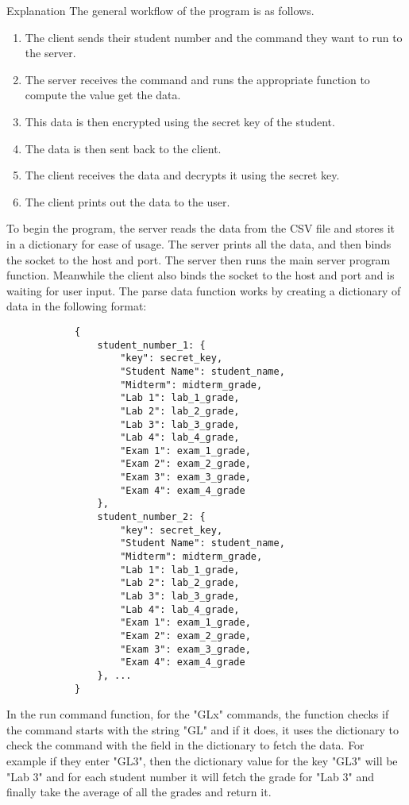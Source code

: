 \documentclass[titlepage]{article}
\begin{document}
    \begin{section}{Explanation}
        The general workflow of the program is as follows.
        \begin{enumerate}
            \item The client sends their student number and the command they want to run to the server.
            \item The server receives the command and runs the appropriate function to compute the value get the data.
            \item This data is then encrypted using the secret key of the student.
            \item The data is then sent back to the client.
            \item The client receives the data and decrypts it using the secret key.
            \item The client prints out the data to the user.
        \end{enumerate}
        To begin the program, the server reads the data from the CSV file and stores it in a dictionary for ease of usage. The server prints all the data, and then binds the socket to the host and port. The server then runs the main server program function. Meanwhile the client also binds the socket to the host and port and is waiting for user input.
        The parse data function works by creating a dictionary of data in the following format:
        \begin{verbatim}
            {
                student_number_1: {
                    "key": secret_key,
                    "Student Name": student_name,
                    "Midterm": midterm_grade,
                    "Lab 1": lab_1_grade,
                    "Lab 2": lab_2_grade,
                    "Lab 3": lab_3_grade,
                    "Lab 4": lab_4_grade,
                    "Exam 1": exam_1_grade,
                    "Exam 2": exam_2_grade,
                    "Exam 3": exam_3_grade,
                    "Exam 4": exam_4_grade
                },
                student_number_2: {
                    "key": secret_key,
                    "Student Name": student_name,
                    "Midterm": midterm_grade,
                    "Lab 1": lab_1_grade,
                    "Lab 2": lab_2_grade,
                    "Lab 3": lab_3_grade,
                    "Lab 4": lab_4_grade,
                    "Exam 1": exam_1_grade,
                    "Exam 2": exam_2_grade,
                    "Exam 3": exam_3_grade,
                    "Exam 4": exam_4_grade
                }, ...
            }
        \end{verbatim}
        In the run command function, for the "GLx" commands, the function checks if the command starts with the string "GL" and if it does, it uses the dictionary to check the command with the field in the dictionary to fetch the data. For example if they enter "GL3", then the dictionary value for the key "GL3" will be "Lab 3" and for each student number it will fetch the grade for "Lab 3" and finally take the average of all the grades and return it.


\end{section}
\end{document}
